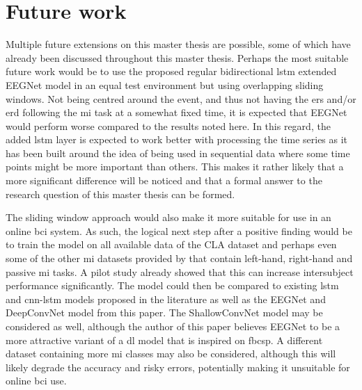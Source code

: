 \section{Future work}
\label{sec:discussion_future_work}

Multiple future extensions on this master thesis are possible, some of which have already been discussed throughout this master thesis.
Perhaps the most suitable future work would be to use the proposed regular bidirectional \gls{lstm} extended EEGNet model in an equal test environment but using overlapping sliding windows.
Not being centred around the event, and thus not having the \gls{ers} and/or \gls{erd} following the \gls{mi} task at a somewhat fixed time, it is expected that EEGNet would perform worse compared to the results noted here.
In this regard, the added \gls{lstm} layer is expected to work better with processing the time series as it has been built around the idea of being used in sequential data where some time points might be more important than others.
This makes it rather likely that a more significant difference will be noticed and that a formal answer to the research question of this master thesis can be formed.

The sliding window approach would also make it more suitable for use in an online \gls{bci} system.
As such, the logical next step after a positive finding would be to train the model on all available data of the CLA dataset and perhaps even some of the other \gls{mi} datasets provided by \citet{eeg_data} that contain left-hand, right-hand and passive \gls{mi} tasks.
A pilot study already showed that this can increase intersubject performance significantly.
The model could then be compared to existing \gls{lstm} and \gls{cnn}-\gls{lstm} models proposed in the literature as well as the EEGNet and DeepConvNet model from this paper.
The ShallowConvNet model may be considered as well, although the author of this paper believes EEGNet to be a more attractive variant of a \gls{dl} model that is inspired on \gls{fbcsp}.
A different dataset containing more \gls{mi} classes may also be considered, although this will likely degrade the accuracy and risky errors, potentially making it unsuitable for online \gls{bci} use.

